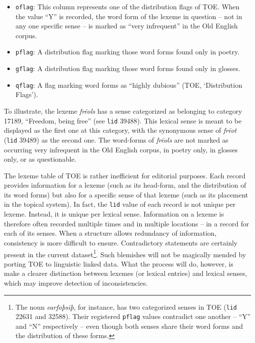 \begin{itemize}
\item \texttt{oflag}: This column represents one of the distribution flags of TOE. When the value “Y” is recorded, the word form of the lexeme in question – not in any one specific sense – is marked as “very infrequent” in the Old English corpus.
\item \texttt{pflag}: A distribution flag marking those word forms found only in poetry.
\item \texttt{gflag}: A distribution flag marking those word forms found only in glosses.
\item \texttt{qflag}: A flag marking word forms as “highly dubious” (TOE, ‘Distribution Flags’).
\end{itemize}

To illustrate, the lexeme \textit{frēols} has a sense categorized as belonging to category 17189, “Freedom, being free” (see \texttt{lid} 39488). This lexical sense is meant to be displayed as the first one at this category, with the synonymous sense of \textit{frēot} (\texttt{lid} 39489) as the second one. The word-forms of \textit{frēols} are not marked as occurring very infrequent in the Old English corpus, in poetry only, in glosses only, or as questionable.

The lexeme table of TOE is rather inefficient for editorial purposes. Each record provides information for a lexeme (such as its head-form, and the distribution of its word forms) but also for a specific sense of that lexeme (such as its placement in the topical system). In fact, the \texttt{lid} value of each record is not unique per lexeme. Instead, it is unique per lexical sense. Information on a lexeme is therefore often recorded multiple times and in multiple locations – in a record for each of its senses. When a structure allows redundancy of information, consistency is more difficult to ensure. Contradictory statements are certainly present in the current dataset\footnote{The noun \textit{earfoþsīþ}, for instance, has two categorized senses in TOE (\texttt{lid} 22631 and 32588). Their registered \texttt{pflag} values contradict one another – “Y” and “N” respectively – even though both senses share their word forms and the distribution of these forms.}. Such blemishes will not be magically mended by porting TOE to linguistic linked data. What the process will do, however, is make a clearer distinction between lexemes (or lexical entries) and lexical senses, which may improve detection of inconsistencies.

